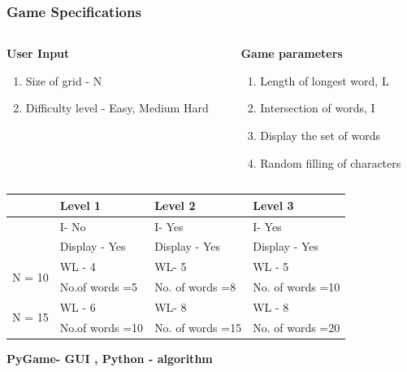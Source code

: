\documentclass{beamer}
\begin{document}
\begin{frame}\frametitle{Game Specifications}
\begin{columns}[c]
\begin{column}{5cm}

\textbf{User Input }
\begin{enumerate}
\item Size of grid - N
\item Difficulty level - Easy, Medium Hard

\end{enumerate}
\end{column}
\begin{column}{5cm}
\textbf{Game parameters}
\begin{enumerate}
\item Length of longest word, L
\item Intersection of words, I
\item Display the set of words  
\item Random filling of characters
\end{enumerate}
\end{column}
\end{columns}

\centering
\label{tablewc}
\resizebox{\columnwidth}{!}
{

\begin{tabular}{|c|l | l | l |}
\hline
 & Level 1 & Level  2 & Level 3 \\
\hline
  & I- No & I- Yes & I- Yes\\
& Display - Yes & Display - Yes & Display - Yes  \\ \hline
\multirow{2}{*}{N = 10}  & WL - 4 &  WL- 5 & WL - 5\\
& No.of words =5 & No. of words =8 & No. of words =10\\
\hline
\multirow{2}{*}{N = 15}  & WL - 6 &  WL- 8 & WL - 8\\
& No.of words =10 & No. of words =15 & No. of words =20\\
\hline
\end{tabular}
}
\vfill
\textbf{PyGame- GUI , Python - algorithm}
\end{frame}
\end{document}
